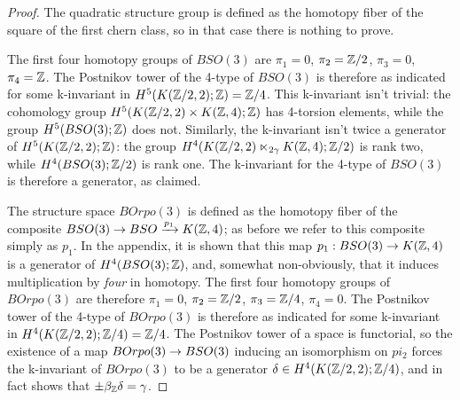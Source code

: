 \documentclass{amsart}
\begin{document}
\begin{proof}
The quadratic structure group is defined as the homotopy fiber of the square of the first chern class, so in that case there is nothing to prove.

The first four homotopy groups of $BSO(3)$ are $\pi_1 = 0$, $\pi_2 = \mathbb Z/2$, $\pi_3 = 0$, $\pi_4 = \mathbb Z$.  The Postnikov tower of the 4-type of $BSO(3)$ is therefore as indicated for some k-invariant in $H^5(K(\mathbb Z/2,2);\mathbb Z) = \mathbb Z/4$.  This k-invariant isn't trivial: the cohomology group $H^5(K(\mathbb Z/2,2) \times K(\mathbb Z,4);\mathbb Z)$ has 4-torsion elements, while the group $H^5(BSO(3);\mathbb Z)$ does not.  Similarly, the k-invariant isn't twice a generator of $H^5(K(\mathbb Z/2,2);\mathbb Z)$: the group $H^4(K(\mathbb Z/2,2) \ltimes_{2\gamma} K(\mathbb Z,4);\mathbb Z/2)$ is rank two, while $H^4(BSO(3);\mathbb Z/2)$ is rank one.  The k-invariant for the 4-type of $BSO(3)$ is therefore a generator, as claimed.

The structure space $BOrpo(3)$ is defined as the homotopy fiber of the composite $BSO(3) \rightarrow BSO \xrightarrow{p_1} K(\mathbb Z,4)$; as before we refer to this composite simply as $p_1$.  In the appendix, it is shown that this map $p_1: BSO(3) \rightarrow K(\mathbb Z,4)$ is a generator of $H^4(BSO(3);\mathbb Z)$, and, somewhat non-obviously, that it induces multiplication by \emph{four} in homotopy.  The first four homotopy groups of $BOrpo(3)$ are therefore $\pi_1 = 0$, $\pi_2 = \mathbb Z/2$, $\pi_3 = \mathbb Z/4$, $\pi_4 = 0$.  The Postnikov tower of the 4-type of $BOrpo(3)$ is therefore as indicated for some k-invariant in $H^4(K(\mathbb Z/2,2);\mathbb Z/4) = \mathbb Z/4$.  The Postnikov tower of a space is functorial, so the existence of a map $BOrpo(3) \rightarrow BSO(3)$ inducing an isomorphism on $pi_2$ forces the k-invariant of $BOrpo(3)$ to be a generator $\delta \in H^4(K(\mathbb Z/2,2);\mathbb Z/4)$, and in fact shows that $\pm \beta_{\mathbb Z} \delta = \gamma$.   
\end{proof}
\end{document}

